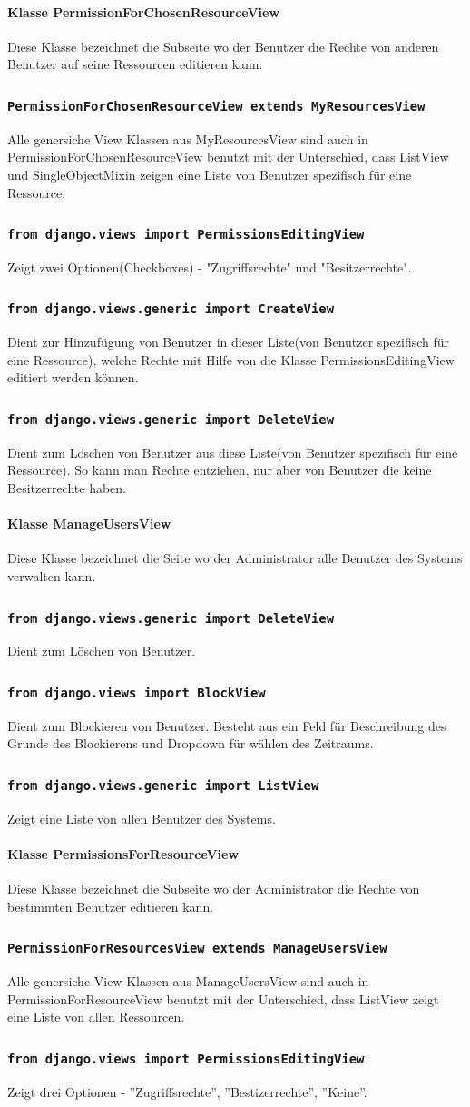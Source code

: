 \documentclass[parskip=full,11pt]{scrartcl}
\newcommand{\class}[1]{\subsubsection*{\lstinline[basicstyle=\ttfamily\large]{#1}}}
\begin{document}
\paragraph*{Klasse PermissionForChosenResourceView}
 Diese Klasse bezeichnet die Subseite wo der Benutzer die Rechte von anderen Benutzer auf seine Ressourcen editieren kann.
\class{PermissionForChosenResourceView extends MyResourcesView}
 Alle genersiche View Klassen aus MyResourcesView sind auch in PermissionForChosenResourceView benutzt mit der Unterschied, dass ListView und SingleObjectMixin zeigen eine Liste von Benutzer spezifisch für eine Ressource.
\class{from django.views import PermissionsEditingView}
Zeigt zwei Optionen(Checkboxes) - "Zugriffsrechte" und "Besitzerrechte".
\class{from django.views.generic import CreateView}
Dient zur Hinzufügung von Benutzer in dieser Liste(von Benutzer spezifisch für eine Ressource), welche Rechte mit Hilfe von die Klasse PermissionsEditingView editiert werden können.
\class{from django.views.generic import DeleteView}
Dient zum Löschen von Benutzer aus diese Liste(von Benutzer spezifisch für eine Ressource). So kann man Rechte entziehen, nur aber von Benutzer die keine Besitzerrechte haben.

\paragraph*{Klasse ManageUsersView}
Diese Klasse bezeichnet die Seite wo der Administrator alle Benutzer des Systems verwalten kann.
\class{from django.views.generic import DeleteView}
Dient zum Löschen von Benutzer.
\class{from django.views import BlockView}
Dient zum Blockieren von Benutzer. Besteht aus ein Feld für Beschreibung des Grunds des Blockierens und Dropdown für wählen des Zeitraums.
\class{from django.views.generic import ListView}
Zeigt eine Liste von allen Benutzer des Systems.

\paragraph*{Klasse PermissionsForResourceView}
 Diese Klasse bezeichnet die Subseite wo der Administrator die Rechte von bestimmten Benutzer editieren kann.
 \class{PermissionForResourcesView extends ManageUsersView}
 Alle genersiche View Klassen aus ManageUsersView sind auch in PermissionForResourceView benutzt mit der Unterschied, dass ListView zeigt eine Liste von allen Ressourcen.
 \class{from django.views import PermissionsEditingView}
 Zeigt drei Optionen - ''Zugriffsrechte'', ''Bestizerrechte'', ''Keine''.
 
\end{document}
